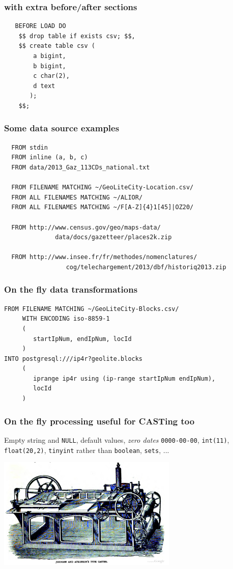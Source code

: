 \documentclass{beamer}
\begin{document}
\begin{frame}[fragile]
  \frametitle{with extra before/after sections}

  \begin{verbatim}
   BEFORE LOAD DO
    $$ drop table if exists csv; $$,
    $$ create table csv (
        a bigint,
        b bigint,
        c char(2),
        d text
       );
    $$;
  \end{verbatim}
\end{frame}

\begin{frame}[fragile]
  \frametitle{Some data source examples}

  \begin{verbatim}
  FROM stdin
  FROM inline (a, b, c)
  FROM data/2013_Gaz_113CDs_national.txt
  
  FROM FILENAME MATCHING ~/GeoLiteCity-Location.csv/
  FROM ALL FILENAMES MATCHING ~/ALIOR/
  FROM ALL FILENAMES MATCHING ~/F[A-Z]{4}1[45]|OZ20/
  
  FROM http://www.census.gov/geo/maps-data/
              data/docs/gazetteer/places2k.zip
  
  FROM http://www.insee.fr/fr/methodes/nomenclatures/
                 cog/telechargement/2013/dbf/historiq2013.zip
\end{verbatim}
\end{frame}

\begin{frame}[fragile]
  \frametitle{On the fly data transformations}

  \begin{verbatim}
FROM FILENAME MATCHING ~/GeoLiteCity-Blocks.csv/
     WITH ENCODING iso-8859-1
     (
        startIpNum, endIpNum, locId
     )
INTO postgresql:///ip4r?geolite.blocks
     (
        iprange ip4r using (ip-range startIpNum endIpNum),
        locId
     )
  \end{verbatim}
\end{frame}

\begin{frame}
  \frametitle{On the fly processing useful for CASTing too}

  Empty string and \texttt{NULL}, default values, \textit{zero
    dates} \texttt{0000-00-00}, \texttt{int(11)}, \texttt{float(20,2)},
  \texttt{tinyint} rather than \texttt{boolean}, \texttt{sets}, ...

  \vfill
   \vfill
  
  \begin{center}
    \includegraphics[height=2.1in]{type-casting-machine.jpg}
  \end{center}
\end{frame}
\end{document}
